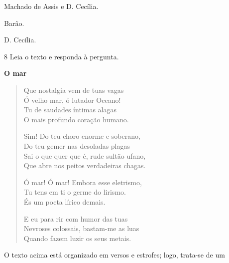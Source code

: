 \begin{escolha}
\begin{escolha}
  \item Machado de Assis e D. Cecília.

  \item Barão.

  \item D. Cecília.

\end{escolha} 


\num{8} Leia o texto e responda à pergunta.

\textbf{O mar}

\begin{verse}
Que nostalgia vem de tuas vagas\\
Ó velho mar, ó lutador Oceano!\\
Tu de saudades íntimas alagas\\
O mais profundo coração humano.

Sim! Do teu choro enorme e soberano,\\
Do teu gemer nas desoladas plagas\\
Sai o que quer que é, rude sultão ufano,\\
Que abre nos peitos verdadeiras chagas.

Ó mar! Ó mar! Embora esse eletrismo,\\
Tu tens em ti o germe do lirismo.\\
És um poeta lírico demais.

E eu para rir com humor das tuas\\
Nevroses colossais, bastam-me as luas\\
Quando fazem luzir os seus metais.
\end{verse}


O texto acima está organizado em versos e estrofes; logo, trata-se de
um


\end{escolha}
